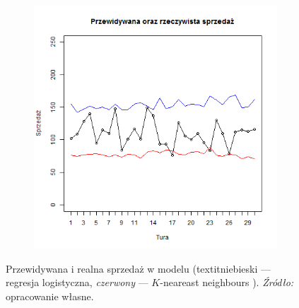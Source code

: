 \documentclass[polish, twoside, 12pt, a4paper]{article}
\theoremstyle{definition}
\theoremstyle{plain}
\theoremstyle{remark}
\begin{document}
\begin{figure}[hbt]
  \centering

  \begin{subfigure}[t]{0.8\textwidth}
    \includegraphics[width=\textwidth]{pictures/prognozy_lg_kn.png}
  \end{subfigure}
  \captionsetup{margin=10pt,font=small,labelfont=bf,width=.8\textwidth}

  \caption[Przewidywana i realna sprzedaż w modelu]{Przewidywana i realna sprzedaż w modelu (textit{niebieski} --- regresja logistyczna, \textit{czerwony} ---  $K$-neareast neighbours ). \textit{Źródło:} opracowanie własne.}\label{fig:prognozy_porowniania}
\end{figure}
\end{document}
